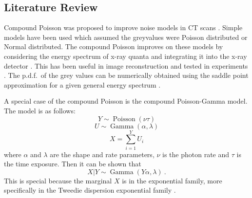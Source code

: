 \documentclass[a4paper]{proc}
\DeclareMathOperator{\gammaDist}{Gamma}
\DeclareMathOperator{\poisson}{Poisson}
\begin{document}
\subsection{Literature Review}
Compound Poisson was proposed to improve noise models in CT scans \cite{whiting2002signal}. Simple models have been used which assumed the greyvalues were Poisson distributed or Normal \cite{lu2002analytical} distributed. The compound Poisson improves on these models by considering the energy spectrum of x-ray quanta and integrating it into the x-ray detector \cite{whiting2006properties}. This has been useful in image reconstruction \cite{elbakri2003efficient}\cite{elbakri2002statistical}\cite{elbakri2001statistical}\cite{lasio2007statistical} and tested in experiments \cite{wang2008experimental}. The p.d.f.~of the grey values can be numerically obtained using the saddle point approximation for a given general energy spectrum \cite{elbakri2003efficient}.

A special case of the compound Poisson is the compound Poisson-Gamma model. The model is as follows:
\begin{equation}
Y\sim\poisson\left(\nu\tau\right)
\end{equation}
\begin{equation}
U\sim\gammaDist\left(\alpha,\lambda\right)
\end{equation}
\begin{equation}
X = \sum_{i=1}^Y U_i
\end{equation}
where $\alpha$ and $\lambda$ are the shape and rate parameters, $\nu$ is the photon rate and $\tau$ is the time exposure. Then it can be shown that
\begin{equation}
X|Y\sim\gammaDist\left(Y\alpha,\lambda\right) \ .
\end{equation}
This is special because the marginal $X$ is in the exponential family, more specifically in the Tweedie dispersion exponential family \cite{jorgensen1987exponential}.
\end{document}
